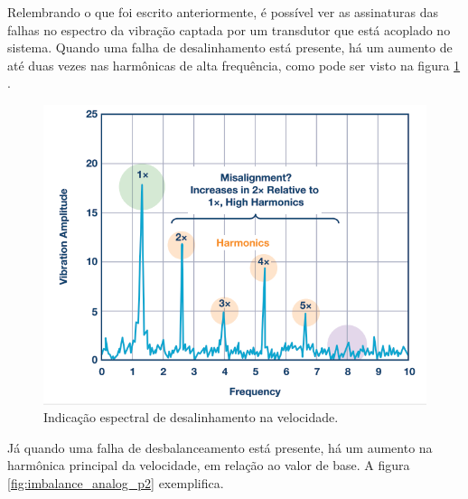 Relembrando o que foi escrito anteriormente, é possível ver as assinaturas das falhas no espectro da vibração captada por um transdutor
que está acoplado no sistema. Quando uma falha de desalinhamento está presente, há um aumento de até duas vezes nas harmônicas de alta 
frequência, como pode ser visto na figura \ref{fig:misa_analog_p2} \cite{Sopcik2019}.

\begin{figure}[H]
    \caption{Indicação espectral de desalinhamento na velocidade.}
    \begin{center}
        \includegraphics[scale=.4]{referencial/img/misa_analog_p2.png}
    \end{center}
    \label{fig:misa_analog_p2}
\end{figure}

Já quando uma falha de desbalanceamento está presente, há um aumento na harmônica principal da velocidade, em relação ao valor de base.
A figura \ref{fig:imbalance_analog_p2} exemplifica.

